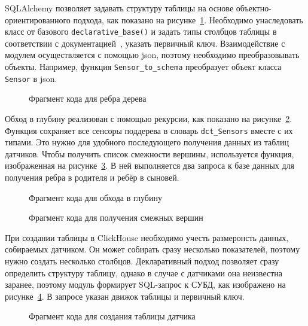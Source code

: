 SQLAlchemy позволяет задавать структуру таблицы на основе объектно-ориентированного подхода, как показано на рисунке~\ref{src1}. Необходимо унаследовать класс от базового \texttt{declarative\_base()} и задать типы столбцов таблицы в соответствии с документацией~\cite{SQLAlchemy-data-types}, указать первичный ключ. Взаимодействие с модулем осуществляется с помощью json, поэтому необходимо преобразовывать объекты. Например, функция \texttt{Sensor\_to\_schema} преобразует объект класса \texttt{Sensor} в json.

\begin{figure}
  \fontsize{12pt}{14pt}\selectfont
  
  \caption{Фрагмент кода для ребра дерева}
  \label{src1}
\end{figure}

Обход в глубину реализован с помощью рекурсии, как показано на рисунке~\ref{src4}. Функция сохраняет все сенсоры поддерева в словарь \texttt{dct\_Sensors} вместе с их типами. Это нужно для удобного последующего получения данных из таблиц датчиков. Чтобы получить список смежности вершины, используется функция, изображенная на рисунке~\ref{src5}. В ней выполняется два запроса к базе данных для получения ребра в родителя и ребёр в сыновей.

\begin{figure}
  \fontsize{12pt}{14pt}\selectfont
  
  \caption{Фрагмент кода для обхода в глубину}
  \label{src4}
\end{figure}

\begin{figure}
  \fontsize{12pt}{14pt}\selectfont
  
  \caption{Фрагмент кода для получения смежных вершин}
  \label{src5}
\end{figure}

При создании таблицы в ClickHouse необходимо учесть размеронсть данных, собираемых датчиком. Он может собирать сразу несколько показателей, поэтому нужно создать несколько столбцов. Декларативный подход позволяет сразу определить структуру таблицу, однако в случае с датчиками она неизвестна заранее, поэтому модуль формирует SQL-запрос к СУБД, как изображено на рисунке~\ref{src2}. В запросе указан движок таблицы и первичный ключ.
\begin{figure}
  \fontsize{12pt}{14pt}\selectfont
  
  \caption{Фрагмент кода для создания таблицы датчика}
  \label{src2}
\end{figure}

